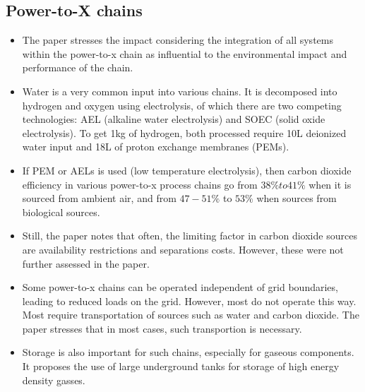 \documentclass[a4paper]{article}
\begin{document}
\subsection{Power-to-X chains}
    \begin{itemize}
        \item The paper stresses the impact considering the integration of all systems within the power-to-x chain as influential to the environmental impact and performance of the chain.
        
        \item Water is a very common input into various chains. It is decomposed into hydrogen and oxygen using electrolysis, of which there are two competing technologies: AEL (alkaline water electrolysis) and SOEC (solid oxide electrolysis). To get 1kg of hydrogen, both processed require 10L deionized water input and 18L of proton exchange membranes (PEMs).
        
        \item If PEM or AELs is used (low temperature electrolysis), then carbon dioxide efficiency in various power-to-x process chains go from $38\% to 41\%$ when it is sourced from ambient air, and from $47-51\%$ to $53\%$ when sources from biological sources. 
        
        \item Still, the paper notes that often, the limiting factor in carbon dioxide sources are availability restrictions and separations costs. However, these were not further assessed in the paper.
        
        \item Some power-to-x chains can be operated independent of grid boundaries, leading to reduced loads on the grid. However, most do not operate this way. Most require transportation of sources such as water and carbon dioxide. The paper stresses that in most cases, such transportion is necessary. 
        
        \item Storage is also important for such chains, especially for gaseous components. It proposes the use of large underground tanks for storage of high energy density gasses.
    \end{itemize}
\end{document}
